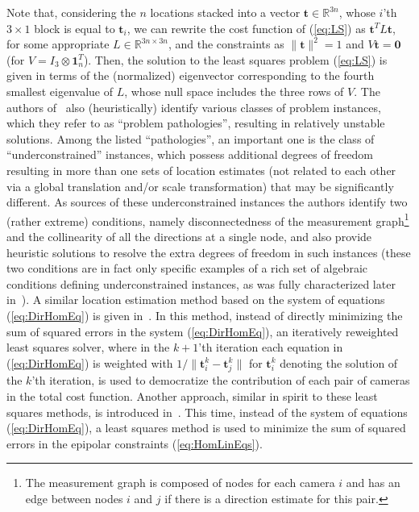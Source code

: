 \documentclass[10pt]{article}
\newcommand{\R}{\ensuremath{\mathbb{R}}}
\begin{document}
Note that, considering the $n$ locations stacked into a vector $\mathbf{t}\in\R^{3n}$, whose $i$'th $3\times1$ block is equal to $\mathbf{t}_i$, we can rewrite the cost function of (\ref{eq:LS}) as $\mathbf{t}^TL\mathbf{t}$, for some appropriate $L\in\R^{3n\times3n}$, and the constraints as $\|\mathbf{t}\|^2=1$ and $V\mathbf{t} = \mathbf{0}$ (for $V = I_3\otimes\mathbf{1}_n^T$). Then, the solution to the least squares problem (\ref{eq:LS}) is given in terms of the (normalized) eigenvector corresponding to the fourth smallest eigenvalue of $L$, whose null space includes the three rows of $V$. The authors of~\cite{BATL2} also (heuristically) identify various classes of problem instances, which they refer to as ``problem pathologies'', resulting in relatively unstable solutions. Among the listed ``pathologies'', an important one is the class of ``underconstrained'' instances, which possess additional degrees of freedom resulting in more than one sets of location estimates (not related to each other via a global translation and/or scale transformation) that may be significantly different. As sources of these underconstrained instances the authors identify two (rather extreme) conditions, namely disconnectedness of the measurement graph\footnote{The measurement graph is composed of nodes for each camera $i$ and has an edge between nodes $i$ and $j$ if there is a direction estimate for this pair.} and the collinearity of all the directions at a single node, and also provide heuristic solutions to resolve the extra degrees of freedom in such instances (these two conditions are in fact only specific examples of a rich set of algebraic conditions defining underconstrained instances, as was fully characterized later in~\cite{CvXSfM,LUD}). A similar location estimation method based on the system of equations (\ref{eq:DirHomEq}) is given in~\cite{GovinduEarlyL2}. In this method, instead of directly minimizing the sum of squared errors in the system (\ref{eq:DirHomEq}), an iteratively reweighted least squares solver, where in the $k+1$'th iteration each equation in (\ref{eq:DirHomEq}) is weighted with $1/\|\mathbf{t}_i^k-\mathbf{t}_j^k\|$ for $\mathbf{t}_i^k$ denoting the solution of the $k$'th iteration, is used to democratize the contribution of each pair of cameras in the total cost function. Another approach, similar in spirit to these least squares methods, is introduced in~\cite{MicaAmitSfM}. This time, instead of the system of equations (\ref{eq:DirHomEq}), a least squares method is used to minimize the sum of squared errors in the epipolar constraints (\ref{eq:HomLinEqs}).
\end{document}
